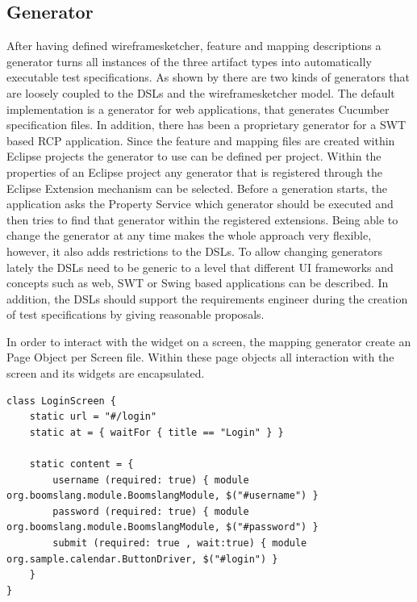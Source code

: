 \documentclass{sig-alternate-05-2015}
\begin{document}
\subsection{Generator}\label{sec:Generator} 
After having defined wireframesketcher, feature and mapping descriptions a generator turns all instances of the three artifact types into automatically executable test specifications.
As shown by  there are two kinds of generators that are loosely coupled to the DSLs and the wireframesketcher model.
The default implementation is a generator for web applications, that generates Cucumber specification files.
In addition, there has been a proprietary generator for a SWT based RCP application.
Since the feature and mapping files are created within Eclipse projects the generator to use can be defined per project.
Within the properties of an Eclipse project any generator that is registered through the Eclipse Extension mechanism can be selected.
Before a generation starts, the application asks the Property Service which generator should be executed and then tries to find that generator within the registered extensions.
Being able to change the generator at any time makes the whole approach very flexible, however, it also adds restrictions to the DSLs.
To allow changing generators lately the DSLs need to be generic to a level that different UI frameworks and concepts such as web, SWT or Swing based applications can be described.
In addition, the DSLs should support the requirements engineer during the creation of test specifications by giving reasonable proposals.

In order to interact with the widget on a screen, the mapping generator create an Page Object \cite{fowler.2013} per Screen file.
Within these page objects all interaction with the screen and its widgets are encapsulated.

\begin{lstlisting}[captionpos=b, caption=Generated Page Object, label={lst:MappingGenerated}, language=dsl]
class LoginScreen {
	static url = "#/login"
	static at = { waitFor { title == "Login" } }
	
	static content = {
		username (required: true) { module org.boomslang.module.BoomslangModule, $("#username") }
		password (required: true) { module org.boomslang.module.BoomslangModule, $("#password") }
		submit (required: true , wait:true) { module org.sample.calendar.ButtonDriver, $("#login") }
	}
}
\end{lstlisting}
\end{document}
